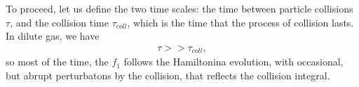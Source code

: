 To proceed, let us define the two time scales:
the time between particle collisions $\tau$, and the collision time $\tau_{coll}$, which is the time that the process of collision lasts. In dilute gas, we have
\begin{align*}
\tau >> \tau_{coll},
\end{align*}
so most of the time, the $f_1$ follows the Hamiltonina evolution, with occasional, but abrupt perturbatons by the collision, that reflects the collision integral.
%
%
%
%
%
%
